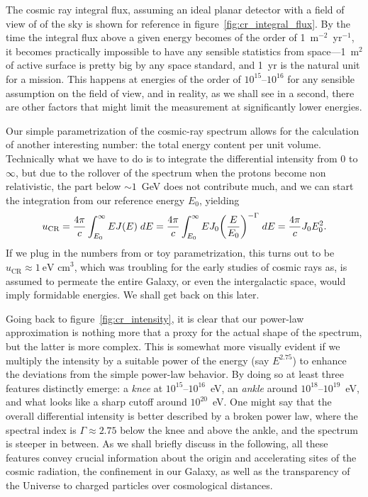 The cosmic ray integral flux, assuming an ideal planar detector with a field of
view of  of the sky is shown for reference in figure~\ref{fig:cr_integral_flux}.
By the time the integral flux above a given energy becomes of the order
of 1~m$^{-2}$~yr$^{-1}$, it becomes practically impossible to have any sensible
statistics from space---1~m$^2$ of active surface is pretty big by any space standard,
and 1~yr is the natural unit for a mission. This happens at energies of the order
of $10^{15}$--$10^{16}$ for any sensible assumption on the field of view, and in
reality, as we shall see in a second, there are other factors that might limit
the measurement at significantly lower energies.

Our simple parametrization of the cosmic-ray spectrum allows for the calculation
of another interesting number: the total energy content per unit volume.
Technically what we have to do is to integrate the differential intensity from
$0$ to $\infty$, but due to the rollover of the spectrum when the protons become
non relativistic, the part below $\sim 1$~GeV does not contribute much,
and we can start the integration from our reference energy $E_0$, yielding
\begin{align}
  u_\text{CR} = \frac{4\pi}{c} \int_{E_0}^\infty E J(E) \;d{E} =
  \frac{4\pi}{c} \int_{E_0}^\infty E J_0 \qty(\frac{E}{E_0})^{-\Gamma} \;d{E} =
  \frac{4\pi}{c} J_0 E_0^2.
\end{align}
If we plug in the numbers from or toy parametrization, this turns out to be
$u_\text{CR} \approx 1~\text{eV~cm}^3$, which was troubling for the early studies
of cosmic rays as, is assumed to permeate the entire Galaxy, or even the
intergalactic space, would imply formidable energies. We shall get back on this
later.

Going back to figure~\ref{fig:cr_intensity}, it is clear that our power-law
approximation is nothing more that a proxy for the actual shape of the spectrum,
but the latter is more complex. This is somewhat more visually evident if we
multiply the intensity by a suitable power of the energy (say $E^{2.75}$) to
enhance the deviations from the simple power-law behavior. By doing so at least
three features distinctly emerge: a \emph{knee} at $10^{15}$--$10^{16}$~eV,
an \emph{ankle} around $10^{18}$--$10^{19}$~eV, and what looks like a sharp cutoff
around $10^{20}$~eV. One might say that the overall differential intensity is
better described by a broken power law, where the spectral index is $\Gamma \approx 2.75$
below the knee and above the ankle, and the spectrum is steeper in between.
As we shall briefly discuss in the following, all these features convey crucial
information about the origin and accelerating sites of the cosmic radiation, the
confinement in our Galaxy, as well as the transparency of the Universe to charged
particles over cosmological distances.


